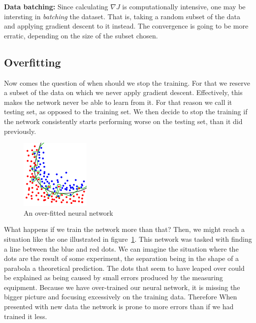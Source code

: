 \documentclass{article}
\theoremstyle{plain}
\theoremstyle{definition}
\theoremstyle{remark}
\begin{document}
\noindent \textbf{Data batching:} Since calculating $\nabla J$ is computationally intensive, one may be intersting in \emph{batching} the dataset. That is, taking a random subset of the data and applying gradient descent to it instead. The convergence is going to be more erratic, depending on the size of the subset chosen.
\subsection{Overfitting}\label{subsection:overfitting}
Now comes the question of when should we stop the training. For that we reserve a subset of the data on which we never apply gradient descent. Effectively, this makes the network never be able to learn from it. For that reason we call it testing set, as opposed to the training set. We then decide to stop the training if the network consistently starts performing worse on the testing set, than it did previously. 
	\begin{figure}[h]
	\centering
	\includegraphics{overfitting.png}
	\caption{An over-fitted neural network \protect \footnotemark}
	\label{fig:overfitting}
	\end{figure}
	
What happens if we train the network more than that? Then, we might reach a situation like the one illustrated in figure~\ref{fig:overfitting}. This network was tasked with finding a line between the blue and red dots. We can imagine the situation where the dots are the result of some experiment, the separation being in the shape of a parabola a theoretical prediction. The dots that seem to have leaped over could be explained as being caused by small errors produced by the measuring equipment. Because we have over-trained our neural network, it is missing the bigger picture and focusing excessively on the training data. Therefore When presented with new data the network is prone to more errors than if we had trained it less.
\end{document}
